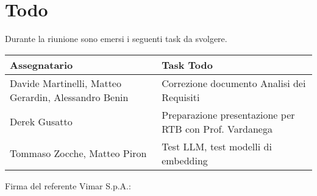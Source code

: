 \section{Todo}
Durante la riunione sono emersi i seguenti task da svolgere.

\begin{center}
  \begin{tabular}{|p{5cm}|p{8cm}|}
    \hline
    \textbf{Assegnatario}       & \textbf{Task Todo} \\ \hline
        Davide Martinelli, Matteo Gerardin, Alessandro Benin & Correzione documento Analisi dei Requisiti \\ \hline
        Derek Gusatto & Preparazione presentazione per RTB con Prof. Vardanega \\ \hline
        Tommaso Zocche, Matteo Piron & Test LLM, test modelli di embedding\\ \hline
        
  \end{tabular}
\end{center}

\vspace{4cm}
\noindent Firma del referente Vimar S.p.A.: \underline{\hspace{5cm}}